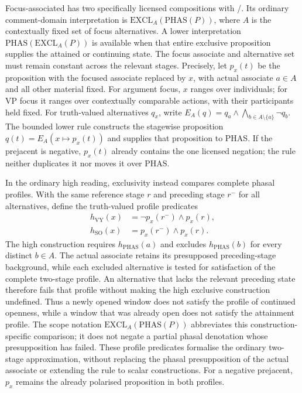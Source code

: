 Focus-associated  has two specifically licensed
compositions with /. Its ordinary comment-domain interpretation
is $\mathrm{EXCL}_{A}(\mathrm{PHAS}(P))$, where $A$ is the contextually fixed
set of focus alternatives. A lower interpretation
$\mathrm{PHAS}(\mathrm{EXCL}_{A}(P))$ is available when that entire exclusive
proposition supplies the attained or continuing state. The focus associate
and alternative set must remain constant across the relevant stages.
Precisely, let $p_x(t)$ be the proposition with the focused associate replaced
by $x$, with actual associate $a\in A$ and all other material fixed.
For argument focus, $x$ ranges over individuals; for VP focus it ranges over
contextually comparable actions, with their participants held fixed. For
truth-valued alternatives $q_x$, write
$E_A(q)=q_a\wedge\bigwedge_{b\in A\setminus\{a\}}\neg q_b$.
The bounded lower rule constructs the stagewise proposition
$q(t)=E_A(x\mapsto p_x(t))$ and supplies that proposition to PHAS.
If the prejacent is negative, $p_x(t)$ already contains the one licensed
negation; the rule neither duplicates it nor moves it over PHAS.

In the ordinary high reading, exclusivity instead compares complete phasal
profiles. With the same reference stage $r$ and preceding stage $r^{-}$ for
all alternatives, define the truth-valued profile predicates
\[
\begin{aligned}
h_{\mathrm{VY}}(x)&=\neg p_x(r^{-})\wedge p_x(r),\\
h_{\mathrm{SO}}(x)&=p_x(r^{-})\wedge p_x(r).
\end{aligned}
\]
The high construction requires $h_{\mathrm{PHAS}}(a)$ and excludes
$h_{\mathrm{PHAS}}(b)$ for every distinct $b\in A$. The actual associate
retains its presupposed preceding-stage background, while each excluded
alternative is tested for satisfaction of the complete two-stage profile.
An alternative that lacks the relevant preceding state therefore fails that
profile without making the high exclusive construction undefined. Thus a
newly opened window does not satisfy the profile of continued openness,
while a window that was already open does not satisfy the attainment profile. The scope notation
$\mathrm{EXCL}_{A}(\mathrm{PHAS}(P))$ abbreviates this construction-specific
comparison; it does not negate a partial phasal denotation whose
presupposition has failed. These profile predicates formalise the ordinary
two-stage approximation, without replacing the phasal presupposition of the
actual associate or extending the rule to scalar constructions. For a negative
prejacent, $p_x$ remains the already polarised proposition in both profiles.

